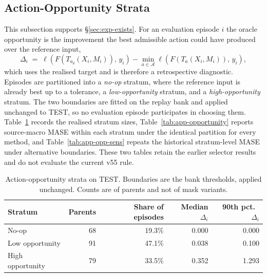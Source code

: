 \documentclass{article}
\newcommand{\calA}{\mathcal{A}}
\newcommand{\loss}{\ell}
\begin{document}
\subsection{Action-Opportunity Strata}
\label{app:opportunity}
This subsection supports \S\ref{sec:exp-exists}. For an evaluation episode $i$ the oracle
opportunity is the improvement the best admissible action could have produced over the
reference input,
\begin{equation}
  \Delta_i \;=\; \loss\!\left(F(T_{a_0}(X_i, M_i)),\, y_i\right) - \min_{a \in \calA} \loss\!\left(F(T_{a}(X_i, M_i)),\, y_i\right),
  \label{eq:opportunity}
\end{equation}
which uses the realised target and is therefore a retrospective diagnostic. Episodes are partitioned into a \emph{no-op} stratum, where the reference input is
already best up to a tolerance, a \emph{low-opportunity} stratum, and a
\emph{high-opportunity} stratum. The two boundaries are fitted on the replay bank and applied
unchanged to TEST, so no evaluation episode participates in choosing them.
Table~\ref{tab:app-opp-sizes} records the realised stratum sizes,
Table~\ref{tab:app-opportunity} reports source-macro MASE within each stratum under the
identical partition for every method, and Table~\ref{tab:app-opp-sens} repeats the
historical stratum-level MASE under alternative boundaries. These two tables retain the earlier selector results and do not evaluate the current v55 rule.

\begin{table}[tp]
  \caption{Action-opportunity strata on TEST. Boundaries are the bank thresholds, applied
  unchanged. Counts are of parents and not of mask variants.}
  \label{tab:app-opp-sizes}
  \centering
  \small
  \setlength{\tabcolsep}{4pt}
\begin{tabular*}{\textwidth}{@{\extracolsep{\fill}}lrrrr@{}}
    \toprule
    Stratum & Parents & Share of episodes & Median $\Delta_i$ & 90th pct.\ $\Delta_i$ \\
    \midrule
    No-op             & 68  & 19.3\%  & 0.000  & 0.000 \\
    Low opportunity   & 91   & 47.1\%   & 0.038   & 0.100 \\
    High opportunity  & 79  & 33.5\%  & 0.352  & 1.293 \\
    \bottomrule
  \end{tabular*}
\end{table}
\end{document}
